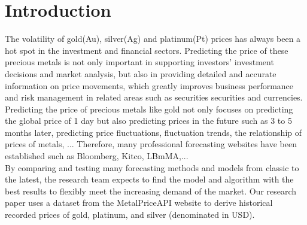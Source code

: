 \documentclass{ieeeojies}
\begin{document}
\titlepgskip=-15pt

\maketitle

\section{Introduction}
\label{sec:introduction}
The volatility of gold(Au), silver(Ag) and platinum(Pt) prices has always been a hot spot in the investment and financial sectors. Predicting the price of these precious metals is not only important in supporting investors' investment decisions and market analysis, but also in providing detailed and accurate information on price movements, which greatly improves business performance and risk management in related areas such as securities securities and currencies.\\
Predicting the price of precious metals like gold not only focuses on predicting the global price of 1 day but also predicting prices in the future such as 3 to 5 months later, predicting price fluctuations, fluctuation trends, the relationship of prices of metals, ... Therefore, many professional forecasting websites have been established such as Bloomberg, Kitco, LBmMA,...\\
By comparing and testing many forecasting methods and models from classic to the latest, the research team expects to find the model and algorithm with the best results to flexibly meet the increasing demand of the market. Our research paper uses a dataset from the MetalPriceAPI website to derive historical recorded prices of gold, platinum, and silver (denominated in USD).
\end{document}
